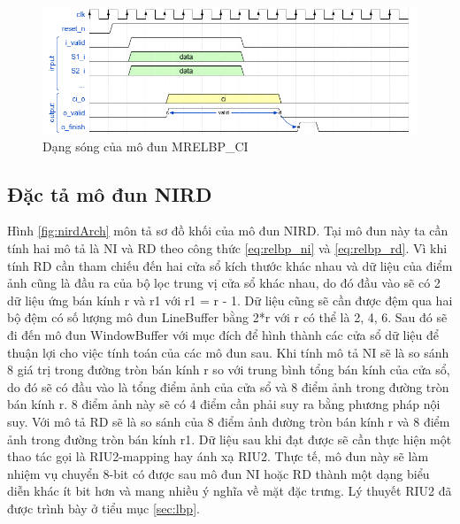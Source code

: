 \begin{figure}[!ht]
    \centering
    \includegraphics[width=\linewidth]{figures/mrelbpCI.png}
    \caption{Dạng sóng của mô đun MRELBP\_CI}
    \label{fig:mrelbpCIl}
\end{figure}
\newpage
\subsection{Đặc tả mô đun NIRD}

Hình \ref{fig:nirdArch} môn tả sơ đồ khối của mô đun NIRD. Tại mô đun này ta cần tính hai mô tả là NI và RD theo công thức \ref{eq:relbp_ni} và \ref{eq:relbp_rd}. Vì khi tính RD cần tham chiếu đến hai cửa sổ kích thước khác nhau và dữ liệu của điểm ảnh cũng là đầu ra của bộ lọc trung vị cửa sổ khác nhau, do đó đầu vào sẽ có 2 dữ liệu ứng bán kính r và r1 với r1 = r - 1. Dữ liệu cũng sẽ cần được đệm qua hai bộ đệm có số lượng mô đun LineBuffer bằng 2*r với r có thể là 2, 4, 6. Sau đó sẽ đi đến mô đun WindowBuffer với mục đích để hình thành các cửa sổ dữ liệu để thuận lợi cho việc tính toán của các mô đun sau. Khi tính mô tả NI sẽ là so sánh 8 giá trị trong đường tròn bán kính r so với trung bình tổng bán kính của cửa sổ, do đó sẽ có đầu vào là tổng điểm ảnh của cửa sổ và 8 điểm ảnh trong đường tròn bán kính r. 8 điểm ảnh này sẽ có 4 điểm cần phải suy ra bằng phương pháp nội suy. Với mô tả RD sẽ là so sánh của 8 điểm ảnh đường tròn bán kính r và 8 điểm ảnh trong đường tròn bán kính r1. Dữ liệu sau khi đạt được sẽ cần thực hiện một thao tác gọi là RIU2-mapping hay ánh xạ RIU2. Thực tế, mô đun này sẽ làm nhiệm vụ chuyển 8-bit có được sau mô đun NI hoặc RD thành một dạng biểu diễn khác ít bit hơn và mang nhiều ý nghĩa về mặt đặc trưng. Lý thuyết RIU2 đã được trình bày ở tiểu mục \ref{sec:lbp}.

